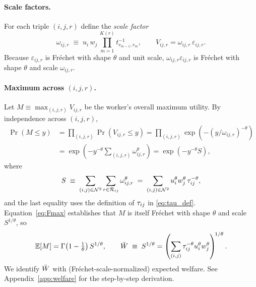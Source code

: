 \paragraph{Scale factors.}
For each triple $(i,j,r)$ define the \emph{scale factor}
\begin{equation}
  \omega_{ij,r}
  \;\equiv\;
  u_i\,w_j\,\prod_{m=1}^{K(r)} t_{r_{m-1},r_{m}}^{-1},
  \qquad
  V_{ij,r}=\omega_{ij,r}\,\varepsilon_{ij,r}.
  \label{eq:omega_def}
\end{equation}
Because $\varepsilon_{ij,r}$ is Fr\'echet with shape $\theta$ and
unit scale, $\omega_{ij,r}\varepsilon_{ij,r}$ is Fr\'echet with
shape $\theta$ and scale $\omega_{ij,r}$.

\paragraph{Maximum across $(i,j,r)$.}
Let $M\equiv\max_{(i,j,r)} V_{ij,r}$ be the worker's overall maximum
utility.  By independence across $(i,j,r)$,
\begin{align}
  \Pr(M\le y)
  &=\prod_{(i,j,r)}\Pr(V_{ij,r}\le y)
   =\prod_{(i,j,r)}\exp\!\left(-(y/\omega_{ij,r})^{-\theta}\right)\nonumber\\
  &=\exp\!\left(-y^{-\theta}\sum_{(i,j,r)}\omega_{ij,r}^{\theta}\right)
   =\exp\!\left(-y^{-\theta}S\right),\label{eq:Fmax}
\end{align}
where
\begin{equation}
  S\;\equiv\;\sum_{(i,j)\in\mathcal N^{2}}\sum_{r\in\mathcal R_{ij}}\omega_{ij,r}^{\theta}
  \;=\;\sum_{(i,j)\in\mathcal N^{2}} u_i^{\theta}w_j^{\theta}\,\tau_{ij}^{-\theta},
  \label{eq:S_def}
\end{equation}
and the last equality uses the definition of $\tau_{ij}$ in
\eqref{eq:tau_def}.  Equation~\eqref{eq:Fmax} establishes that $M$ is
itself Fr\'echet with shape $\theta$ and scale $S^{1/\theta}$, so
\begin{equation}
  \mathbb E[M]=\Gamma\!\left(1-\tfrac{1}{\theta}\right)S^{1/\theta},
  \qquad
  \bar W\;\equiv\;S^{1/\theta}
  =\left(\sum_{(i,j)}\tau_{ij}^{-\theta}u_i^{\theta}w_j^{\theta}\right)^{\!1/\theta}.
  \label{eq:W_def}
\end{equation}
We identify $\bar W$ with (Fr\'echet-scale-normalized) expected
welfare.  See Appendix~\ref{app:welfare} for the step-by-step
derivation.

